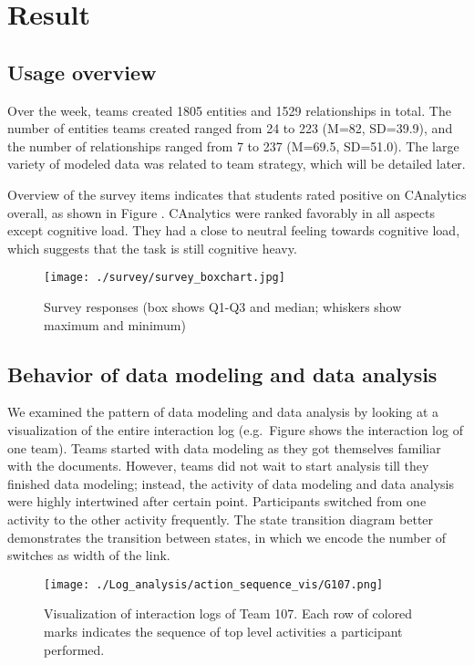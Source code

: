 \section{Result}\label{result}

\subsection{Usage overview}\label{usage-overview}

Over the week, teams created 1805 entities and 1529 relationships in
total. The number of entities teams created ranged from 24 to 223 (M=82,
SD=39.9), and the number of relationships ranged from 7 to 237 (M=69.5,
SD=51.0). The large variety of modeled data was related to team
strategy, which will be detailed later.

Overview of the survey items indicates that students rated positive on
CAnalytics overall, as shown in Figure \autocite{fig:survey}. CAnalytics
were ranked favorably in all aspects except cognitive load. They had a
close to neutral feeling towards cognitive load, which suggests that the
task is still cognitive heavy.

\begin{figure}
	\centering
	\texttt{[image: ./survey/survey\_boxchart.jpg]}
	\caption{Survey responses (box shows Q1-Q3 and median; whiskers show
		maximum and minimum)}\label{fig:survey}
\end{figure}

\subsection{Behavior of data modeling and data
	analysis}\label{behavior-of-data-modeling-and-data-analysis}

We examined the pattern of data modeling and data analysis by looking at
a visualization of the entire interaction log (e.g.~Figure
\autocite{fig:sequence} shows the interaction log of one team). Teams
started with data modeling as they got themselves familiar with the
documents. However, teams did not wait to start analysis till they
finished data modeling; instead, the activity of data modeling and data
analysis were highly intertwined after certain point. Participants
switched from one activity to the other activity frequently. The state
transition diagram \autocite{fig:transition} better demonstrates the
transition between states, in which we encode the number of switches as
width of the link.

\begin{figure}
	\centering
	\texttt{[image: ./Log\_analysis/action\_sequence\_vis/G107.png]}
	\caption{Visualization of interaction logs of Team 107. Each row of
		colored marks indicates the sequence of top level activities a
		participant performed.}\label{fig:sequence}
\end{figure}

